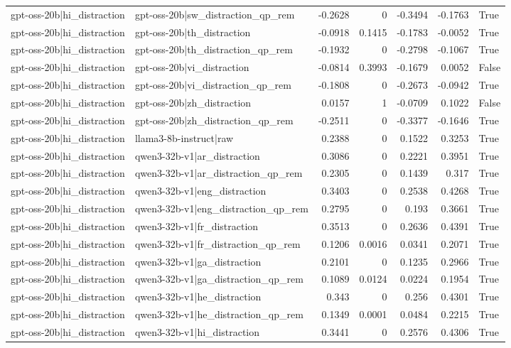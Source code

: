 \begin{table}
\begin{tabular}{l l r r r r l}
gpt-oss-20b|hi_distraction & gpt-oss-20b|sw_distraction_qp_rem & -0.2628 & 0 & -0.3494 & -0.1763 & True \\
gpt-oss-20b|hi_distraction & gpt-oss-20b|th_distraction & -0.0918 & 0.1415 & -0.1783 & -0.0052 & True \\
gpt-oss-20b|hi_distraction & gpt-oss-20b|th_distraction_qp_rem & -0.1932 & 0 & -0.2798 & -0.1067 & True \\
gpt-oss-20b|hi_distraction & gpt-oss-20b|vi_distraction & -0.0814 & 0.3993 & -0.1679 & 0.0052 & False \\
gpt-oss-20b|hi_distraction & gpt-oss-20b|vi_distraction_qp_rem & -0.1808 & 0 & -0.2673 & -0.0942 & True \\
gpt-oss-20b|hi_distraction & gpt-oss-20b|zh_distraction & 0.0157 & 1 & -0.0709 & 0.1022 & False \\
gpt-oss-20b|hi_distraction & gpt-oss-20b|zh_distraction_qp_rem & -0.2511 & 0 & -0.3377 & -0.1646 & True \\
gpt-oss-20b|hi_distraction & llama3-8b-instruct|raw & 0.2388 & 0 & 0.1522 & 0.3253 & True \\
gpt-oss-20b|hi_distraction & qwen3-32b-v1|ar_distraction & 0.3086 & 0 & 0.2221 & 0.3951 & True \\
gpt-oss-20b|hi_distraction & qwen3-32b-v1|ar_distraction_qp_rem & 0.2305 & 0 & 0.1439 & 0.317 & True \\
gpt-oss-20b|hi_distraction & qwen3-32b-v1|eng_distraction & 0.3403 & 0 & 0.2538 & 0.4268 & True \\
gpt-oss-20b|hi_distraction & qwen3-32b-v1|eng_distraction_qp_rem & 0.2795 & 0 & 0.193 & 0.3661 & True \\
gpt-oss-20b|hi_distraction & qwen3-32b-v1|fr_distraction & 0.3513 & 0 & 0.2636 & 0.4391 & True \\
gpt-oss-20b|hi_distraction & qwen3-32b-v1|fr_distraction_qp_rem & 0.1206 & 0.0016 & 0.0341 & 0.2071 & True \\
gpt-oss-20b|hi_distraction & qwen3-32b-v1|ga_distraction & 0.2101 & 0 & 0.1235 & 0.2966 & True \\
gpt-oss-20b|hi_distraction & qwen3-32b-v1|ga_distraction_qp_rem & 0.1089 & 0.0124 & 0.0224 & 0.1954 & True \\
gpt-oss-20b|hi_distraction & qwen3-32b-v1|he_distraction & 0.343 & 0 & 0.256 & 0.4301 & True \\
gpt-oss-20b|hi_distraction & qwen3-32b-v1|he_distraction_qp_rem & 0.1349 & 0.0001 & 0.0484 & 0.2215 & True \\
gpt-oss-20b|hi_distraction & qwen3-32b-v1|hi_distraction & 0.3441 & 0 & 0.2576 & 0.4306 & True \\

\end{tabular}
\end{table}
